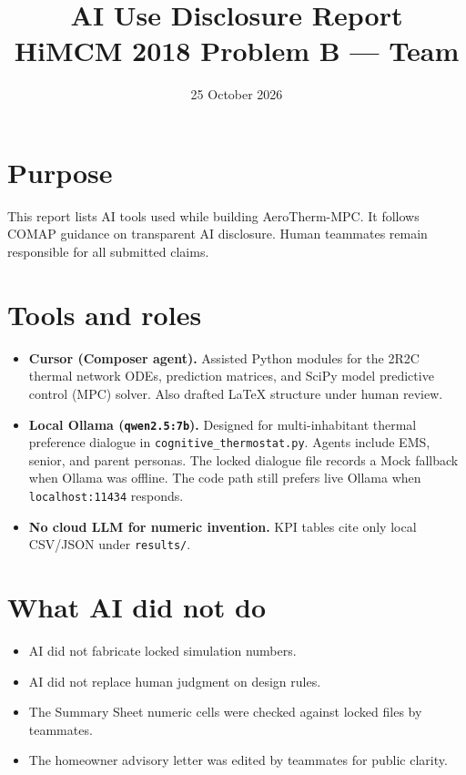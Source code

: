 \documentclass[11pt]{article}
\title{\textbf{AI Use Disclosure Report}\\[0.25em]
\large HiMCM 2018 Problem B --- Team \TeamNumber}
\author{}\date{25 October 2026}
\begin{document}
\maketitle

\section{Purpose}
This report lists AI tools used while building AeroTherm-MPC.
It follows COMAP guidance on transparent AI disclosure.
Human teammates remain responsible for all submitted claims.

\section{Tools and roles}
\begin{itemize}[leftmargin=1.2em,itemsep=0.35em]
  \item \textbf{Cursor (Composer agent).}
  Assisted Python modules for the 2R2C thermal network ODEs,
  prediction matrices, and SciPy model predictive control (MPC) solver.
  Also drafted LaTeX structure under human review.
  \item \textbf{Local Ollama (\texttt{qwen2.5:7b}).}
  Designed for multi-inhabitant thermal preference dialogue
  in \texttt{cognitive\_thermostat.py}.
  Agents include EMS, senior, and parent personas.
  The locked dialogue file records a Mock fallback when Ollama was offline.
  The code path still prefers live Ollama when \texttt{localhost:11434} responds.
  \item \textbf{No cloud LLM for numeric invention.}
  KPI tables cite only local CSV/JSON under \texttt{results/}.
\end{itemize}

\section{What AI did not do}
\begin{itemize}[leftmargin=1.2em,itemsep=0.35em]
  \item AI did not fabricate locked simulation numbers.
  \item AI did not replace human judgment on design rules.
  \item The Summary Sheet numeric cells were checked against locked files by teammates.
  \item The homeowner advisory letter was edited by teammates for public clarity.
\end{itemize}
\end{document}
